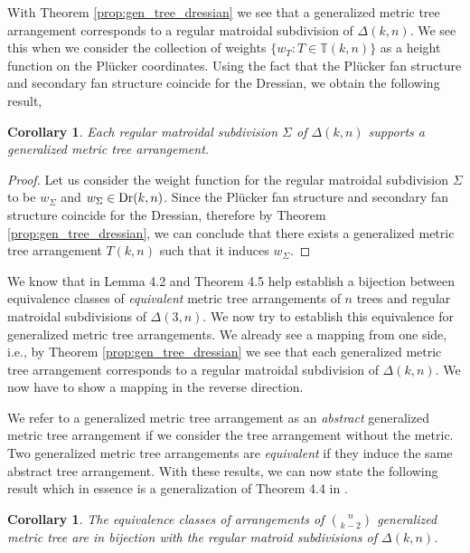 \documentclass[10pt,a4paper]{amsart}
\newcommand{\TT}{\mathbb{T}}
\DeclareMathOperator{\Dr}{\rm Dr}
\theoremstyle{plain}
\newtheorem{corollary}[theorem]{Corollary}
\theoremstyle{definition}
\numberwithin{subcase}{case}
\begin{document}
With Theorem \ref{prop:gen_tree_dressian} we see that a generalized metric tree arrangement corresponds to a regular matroidal subdivision of $\Delta(k,n)$. We see this when we consider the collection of weights $\{w_T \colon T \in \TT(k,n) \}$ as a height function on the Pl\"ucker coordinates. Using the fact that the Pl\"ucker fan structure and secondary fan structure coincide for the Dressian, we obtain the following result,

\begin{corollary}\label{lem:sub_to_gen_trees}
Each regular matroidal subdivision $\Sigma$ of $\Delta(k,n)$ supports a generalized metric tree arrangement.  
\end{corollary}


\begin{proof}
Let us consider the weight function for the regular matroidal subdivision $\Sigma$ to be $w_{\Sigma}$ and $w_{\Sigma} \in \Dr(k,n)$. Since the Pl\"ucker fan structure and secondary fan structure coincide for the Dressian, therefore by Theorem \ref{prop:gen_tree_dressian}, we can conclude that there exists a generalized metric tree arrangement $T(k,n)$ such that it induces $w_{\Sigma}$.
\end{proof}

We know that in \cite{herrmann2009draw} Lemma 4.2 and Theorem 4.5 help establish a bijection between equivalence classes of \emph{equivalent} metric tree arrangements of $n$ trees and regular matroidal subdivisions of $\Delta(3,n)$. We now try to establish this equivalence for generalized metric tree arrangements. We already see a mapping from one side, i.e., by Theorem \ref{prop:gen_tree_dressian} we see that each generalized metric tree arrangement corresponds to a regular matroidal subdivision of $\Delta(k,n)$. We now have to show a mapping in the reverse direction. 

We refer to a generalized metric tree arrangement as an \emph{abstract} generalized metric tree arrangement if we consider the tree arrangement without the metric. Two generalized metric tree arrangements are \emph{equivalent} if they induce the same abstract tree arrangement. With these results, we can now state the following result which in essence is a generalization of Theorem 4.4 in \cite{herrmann2009draw}.

\begin{corollary}
The equivalence classes of arrangements of $\binom{n}{k-2}$ generalized metric tree are in bijection with the regular matroid subdivisions of $\Delta(k,n)$.
\end{corollary}
\end{document}
